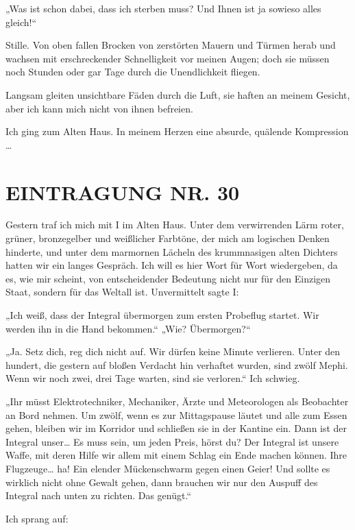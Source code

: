 „Was ist schon dabei, dass ich sterben muss? Und Ihnen ist ja
sowieso alles gleich!“

Stille. Von oben fallen Brocken von zerstörten Mauern und Türmen
herab und wachsen mit erschreckender Schnelligkeit vor meinen
Augen; doch sie müssen noch Stunden oder gar Tage durch die
Unendlichkeit fliegen.

Langsam gleiten unsichtbare Fäden durch die Luft, sie haften an
meinem Gesicht, aber ich kann mich nicht von ihnen befreien.

Ich ging zum Alten Haus. In meinem Herzen eine absurde, quälende
Kompression \ldots{}

\section{EINTRAGUNG NR. 30}

Gestern traf ich mich mit I im Alten Haus. Unter dem verwirrenden
Lärm roter, grüner, bronzegelber und weißlicher Farbtöne, der mich
am logischen Denken hinderte, und unter dem marmornen Lächeln des
krummnasigen alten Dichters hatten wir ein langes Gespräch. Ich
will es hier Wort für Wort wiedergeben, da es, wie mir scheint, von
entscheidender Bedeutung nicht nur für den Einzigen Staat, sondern
für das Weltall ist. Unvermittelt sagte I:

„Ich weiß, dass der Integral übermorgen zum ersten Probeflug
startet. Wir werden ihn in die Hand bekommen.“ „Wie? Übermorgen?“

„Ja. Setz dich, reg dich nicht auf. Wir dürfen keine Minute
verlieren. Unter den hundert, die gestern auf bloßen Verdacht hin
verhaftet wurden, sind zwölf Mephi. Wenn wir noch zwei, drei Tage
warten, sind sie verloren.“ Ich schwieg.

„Ihr müsst Elektrotechniker, Mechaniker, Ärzte und Meteorologen als
Beobachter an Bord nehmen. Um zwölf, wenn es zur Mittagspause
läutet und alle zum Essen gehen, bleiben wir im Korridor und
schließen sie in der Kantine ein. Dann ist der Integral unser\ldots{} Es
muss sein, um jeden Preis, hörst du? Der Integral ist unsere Waffe,
mit deren Hilfe wir allem mit einem Schlag ein Ende machen können.
Ihre Flugzeuge\ldots{} ha! Ein elender Mückenschwarm gegen einen Geier!
Und sollte es wirklich nicht ohne Gewalt gehen, dann brauchen wir
nur den Auspuff des Integral nach unten zu richten. Das genügt.“

Ich sprang auf:

